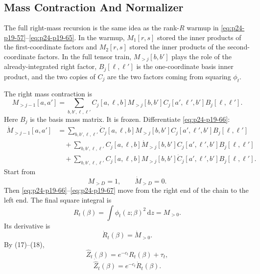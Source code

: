 \documentclass[11pt]{article}
\numberwithin{equation}{section}
\newcommand{\dd}{\,\mathrm d}
\begin{document}
\subsection{Mass Contraction And Normalizer}

The full right-mass recursion is the same idea as the rank-\(R\) warmup in
\eqref{eq:p24-p19-57}--\eqref{eq:p24-p19-65}.  In the warmup, \(M_1[r,s]\) stored the inner products of the
first-coordinate factors and \(M_2[r,s]\) stored the inner products of the
second-coordinate factors.  In the full tensor train, \(M_{>j}[b,b']\) plays
the role of the already-integrated right factor, \(B_j[\ell,\ell']\) is the
one-coordinate basis inner product, and the two copies of \(C_j\) are the two
factors coming from squaring \(\phi_t\).

The right mass contraction is
\begin{equation}
    M_{>j-1}[a,a']
    =
    \sum_{b,b',\ell,\ell'}
    C_j[a,\ell,b]
    M_{>j}[b,b']
    C_j[a',\ell',b']
    B_j[\ell,\ell'].
    \label{eq:p24-p19-66}
\end{equation}
Here \(B_j\) is the basis mass matrix.  It is frozen.  Differentiate \eqref{eq:p24-p19-66}:
\begin{equation}
\begin{aligned}
    \dot M_{>j-1}[a,a']
    &=
    \sum_{b,b',\ell,\ell'}
    \dot C_j[a,\ell,b]
    M_{>j}[b,b']
    C_j[a',\ell',b']
    B_j[\ell,\ell']\\
    &\quad+
    \sum_{b,b',\ell,\ell'}
    C_j[a,\ell,b]
    \dot M_{>j}[b,b']
    C_j[a',\ell',b']
    B_j[\ell,\ell']\\
    &\quad+
    \sum_{b,b',\ell,\ell'}
    C_j[a,\ell,b]
    M_{>j}[b,b']
    \dot C_j[a',\ell',b']
    B_j[\ell,\ell'].
\end{aligned}
\label{eq:p24-p19-67}
\end{equation}
Start from
\begin{equation}
    M_{>D}=1,
    \qquad
    \dot M_{>D}=0.
    \label{eq:p24-p19-68}
\end{equation}
Then \eqref{eq:p24-p19-66}--\eqref{eq:p24-p19-67} move from the right end of the chain to the left end.  The
final square integral is
\begin{equation}
    R_t(\beta)=\int\phi_t(z;\beta)^2\dd z=M_{>0}.
    \label{eq:p24-p19-69}
\end{equation}
Its derivative is
\begin{equation}
    \dot R_t(\beta)=\dot M_{>0}.
    \label{eq:p24-p19-70}
\end{equation}
By (17)--(18),
\begin{equation}
    \widehat Z_t(\beta)=e^{-c_t}R_t(\beta)+\tau_t,
    \label{eq:p24-p19-71}
\end{equation}
\begin{equation}
    \dot{\widehat Z}_t(\beta)=e^{-c_t}\dot R_t(\beta).
    \label{eq:p24-p19-72}
\end{equation}
\end{document}

